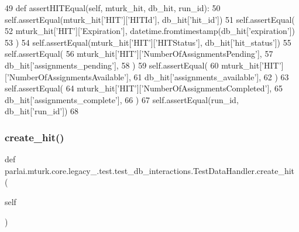 \begin{DoxyCode}
49     \textcolor{keyword}{def }assertHITEqual(self, mturk\_hit, db\_hit, run\_id):
50         self.assertEqual(mturk\_hit[\textcolor{stringliteral}{'HIT'}][\textcolor{stringliteral}{'HITId'}], db\_hit[\textcolor{stringliteral}{'hit\_id'}])
51         self.assertEqual(
52             mturk\_hit[\textcolor{stringliteral}{'HIT'}][\textcolor{stringliteral}{'Expiration'}], datetime.fromtimestamp(db\_hit[\textcolor{stringliteral}{'expiration'}])
53         )
54         self.assertEqual(mturk\_hit[\textcolor{stringliteral}{'HIT'}][\textcolor{stringliteral}{'HITStatus'}], db\_hit[\textcolor{stringliteral}{'hit\_status'}])
55         self.assertEqual(
56             mturk\_hit[\textcolor{stringliteral}{'HIT'}][\textcolor{stringliteral}{'NumberOfAssignmentsPending'}],
57             db\_hit[\textcolor{stringliteral}{'assignments\_pending'}],
58         )
59         self.assertEqual(
60             mturk\_hit[\textcolor{stringliteral}{'HIT'}][\textcolor{stringliteral}{'NumberOfAssignmentsAvailable'}],
61             db\_hit[\textcolor{stringliteral}{'assignments\_available'}],
62         )
63         self.assertEqual(
64             mturk\_hit[\textcolor{stringliteral}{'HIT'}][\textcolor{stringliteral}{'NumberOfAssignmentsCompleted'}],
65             db\_hit[\textcolor{stringliteral}{'assignments\_complete'}],
66         )
67         self.assertEqual(run\_id, db\_hit[\textcolor{stringliteral}{'run\_id'}])
68 
\end{DoxyCode}
\mbox{\label{classparlai_1_1mturk_1_1core_1_1legacy__2018_1_1test_1_1test__db__interactions_1_1TestDataHandler_a4b6e2a2603dfb8ae8dfb74c84bb57c1b}} 
\subsubsection{\texorpdfstring{create\+\_\+hit()}{create\_hit()}}
{\footnotesize\ttfamily def parlai.\+mturk.\+core.\+legacy\+\_.\+test.\+test\+\_\+db\+\_\+interactions.\+Test\+Data\+Handler.\+create\+\_\+hit (\begin{DoxyParamCaption}\item[{}]{self }\end{DoxyParamCaption})}



